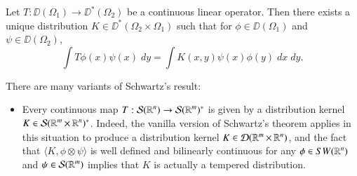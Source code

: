 \begin{theorem}
  Let $T: \DD(\Omega_1) \to \DD^*(\Omega_2)$ be a continuous linear operator. Then there exists a unique distribution $K \in \DD^*(\Omega_2 \times \Omega_1)$ such that for $\phi \in \DD(\Omega_1)$ and $\psi \in \DD(\Omega_2)$,
  \[ \int T\phi(x) \psi(x)\; dy = \int K(x,y) \psi(x) \phi(y)\; dx\; dy. \]
\end{theorem}

\begin{remark}
    There are many variants of Schwartz's result:
    \begin{itemize}
        \item Every continuous map $T: \operatorname{\mathcal{S}}(\operatorname{\mathbb{R}}^n) \to \operatorname{\mathcal{S}}(\operatorname{\mathbb{R}}^m)^*$ is given by a distribution kernel $K \in \operatorname{\mathcal{S}}(\operatorname{\mathbb{R}}^m \times \operatorname{\mathbb{R}}^n)^*$. Indeed, the vanilla version of Schwartz's theorem applies in this situation to produce a distribution kernel $K \in \operatorname{\mathcal{D}}(\operatorname{\mathbb{R}}^m \times \operatorname{\mathbb{R}}^n)$, and the fact that $\langle K, \phi \otimes \psi \rangle$ is well defined and bilinearly continuous for any $\phi \in SW(\operatorname{\mathbb{R}}^n)$ and $\psi \in \operatorname{\mathcal{S}}(\operatorname{\mathbb{R}}^m)$ implies that $K$ is actually a tempered distribution.


\end{itemize}
\end{remark}
